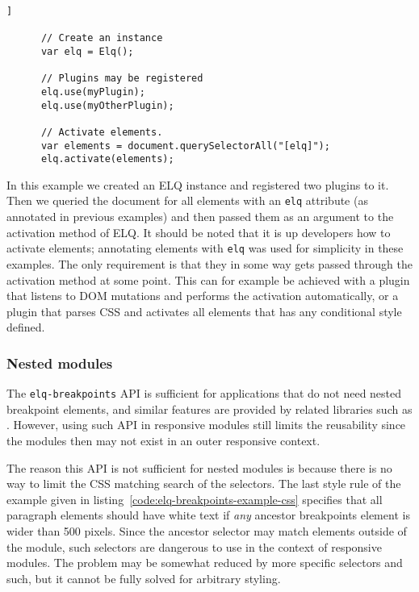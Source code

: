 \documentclass{acm_proc_article-sp}
\newcommand{\code}[1]{\texttt{#1}}
\newcommand{\elq}{ELQ}
\begin{document}
    \begin{lstlisting}[gobble=6,caption={}]]

      // Create an instance
      var elq = Elq();

      // Plugins may be registered
      elq.use(myPlugin);
      elq.use(myOtherPlugin);

      // Activate elements.
      var elements = document.querySelectorAll("[elq]");
      elq.activate(elements);

    \end{lstlisting}

    In this example we created an \elq{} instance and registered two plugins to it.
    Then we queried the document for all elements with an \code{elq} attribute (as annotated in previous examples) and then passed them as an argument to the activation method of \elq{}.
    It should be noted that it is up developers how to activate elements; annotating elements with \code{elq} was used for simplicity in these examples.
    The only requirement is that they in some way gets passed through the activation method at some point.
    This can for example be achieved with a plugin that listens to DOM mutations and performs the activation automatically, or a plugin that parses CSS and activates all elements that has any conditional style defined.

    \subsubsection{Nested modules}
      The \code{elq-breakpoints} API is sufficient for applications that do not need nested breakpoint elements, and similar features are provided by related libraries such as \cite{eq_imp_eqjs,eq_imp_responsive-elements-2}.
      However, using such API in responsive modules still limits the reusability since the modules then may not exist in an outer responsive context.

      The reason this API is not sufficient for nested modules is because there is no way to limit the CSS matching search of the selectors.
      The last style rule of the example given in listing~\ref{code:elq-breakpoints-example-css} specifies that all paragraph elements should have white text if \emph{any} ancestor breakpoints element is wider than 500 pixels.
      Since the ancestor selector may match elements outside of the module, such selectors are dangerous to use in the context of responsive modules.
      The problem may be somewhat reduced by more specific selectors and such, but it cannot be fully solved for arbitrary styling.
\end{document}
